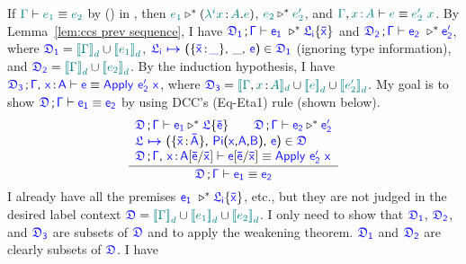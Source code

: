 \begin{lemma}
If $\color{teal}{\Gamma}\color{black} \vdash \color{teal}{e_1}\color{black} \equiv \color{teal}{e_2}\color{black}$ by () in {\ccs}, then 
$\color{teal}{e_1}\color{black} \triangleright^* (\color{teal}{\lambda^i x}\color{black} \hspace{0.5mm}{:}\hspace{0.5mm} \color{teal}{A}\color{black} . \color{teal}{e}\color{black})$, 
$\color{teal}{e_2}\color{black} \triangleright^* \color{teal}{e_2'}\color{black}$, 
and $\helper{\Gamma}, \helper{x \goodcolon A} \vdash \helper{e} \equiv \helper{e_2'\ x}$. 
By Lemma~\ref{lem:ccs prev sequence}, I have 
$\target{\fdef_1} \semicolon \target{\Gamma} \vdash \target{e_1}\ \triangleright^* \targetlab{\flabel_i}{\bar{x}}$ and
$\target{\fdef_2} \semicolon \target{\Gamma} \vdash \target{e_2}\ \triangleright^* \target{e_2'}$, where 
$\target{\fdef_1} = \helper{\bbracket{\Gamma}_d} \cup \helper{\bbracket{e_1}_d}$,
$\itemdef{\target{\flabel_i}}{\itemtype{\bar{x}}{\_}}{\_}{\target{e}} \in \target{\fdef_1}$ (ignoring type information), and
$\target{\fdef_2} = \helper{\bbracket{\Gamma}_d} \cup \helper{\bbracket{e_2}_d}$. 
By the induction hypothesis, I have
$\target{\fdef_3} \semicolon \target{\Gamma} \sfcomma \itemtype{x}{A} \vdash \target{e} \equiv \targetapp{e_2'}{x}$, where
$\target{\fdef_3} = \hbracketd{\helper{\Gamma}, \helper{x} \goodcolon \helper{A}} \cup \helper{\bbracket{e}_d} \cup \helper{\bbracket{e_2'}_d}$. My goal is to show
$\target{\fdef}\semicolon \target{\Gamma} \vdash \target{e_1} \equiv \target{e_2}$ by using DCC's (Eq-Eta1) rule (shown below).
\begin{equation*}
	\frac
		{\begin{array}{l}
		  \target{\fdef}\semicolon \target{\Gamma} \vdash \target{e_1} \triangleright^* \targetlab{\flabel}{\bar{e}} \qquad
          \target{\fdef}\semicolon \target{\Gamma} \vdash \target{e_2} \triangleright^* \target{e_2'} \\
          \itemdef{\target{\flabel}}{\itemtype{\bar{x}}{\bar{A}}}{\targetpi{x}{A}{B}}{\target{e}} \in \target{\fdef} \\
          \target{\fdef}\semicolon \target{\Gamma}\sfcomma \itemtype{x}{A} \targetsub{\bar{e}}{\bar{x}} \vdash 
          \target{e}\targetsub{\bar{e}}{\bar{x}} \equiv \targetapp{e_2'}{x}
    	\end{array}}
		{\target{\fdef}\semicolon \target{\Gamma} \vdash \target{e_1} \equiv \target{e_2}}
\end{equation*}
I already have all the premises $\target{e_1}\ \triangleright^* \targetlab{\flabel_i}{\bar{x}}$, etc., but they are not judged in the desired label context $\target{\fdef} = \helper{\bbracket{\Gamma}_d} \cup \helper{\bbracket{e_1}_d} \cup \helper{\bbracket{e_2}_d}$. I only need to show that $\target{\fdef_1}$, $\target{\fdef_2}$, and $\target{\fdef_3}$ are subsets of $\target{\fdef}$ and to apply the weakening theorem. $\target{\fdef_1}$ and $\target{\fdef_2}$ are clearly subsets of $\target{\fdef}$. I have

\end{lemma}
